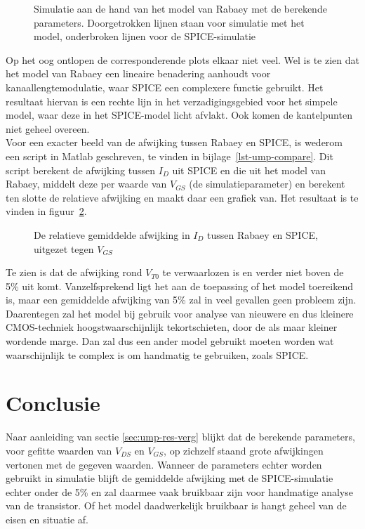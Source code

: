 \documentclass{scrartcl}
\begin{document}
\begin{figure}[H]
	\centering
	\setlength{} 
	\setlength{}
	
	\caption{Simulatie aan de hand van het model van Rabaey met de berekende parameters. Doorgetrokken lijnen staan voor simulatie met het model, onderbroken lijnen voor de SPICE-simulatie}
	\label{fig:ump-sim-fig-vds-rab}
\end{figure}

Op het oog ontlopen de corresponderende plots elkaar niet veel. Wel is te zien dat het model van Rabaey een lineaire benadering aanhoudt voor kanaallengtemodulatie, waar SPICE een complexere functie gebruikt. Het resultaat hiervan is een rechte lijn in het verzadigingsgebied voor het simpele model, waar deze in het SPICE-model licht afvlakt. Ook komen de kantelpunten niet geheel overeen. \\

Voor een exacter beeld van de afwijking tussen Rabaey en SPICE, is wederom een script in Matlab geschreven, te vinden in bijlage~\ref{lst-ump-compare}. Dit script berekent de afwijking tussen $I_{D}$ uit SPICE en die uit het model van Rabaey, middelt deze per waarde van $V_{GS}$ (de simulatieparameter) en berekent ten slotte de relatieve afwijking en maakt daar een grafiek van. Het resultaat is te vinden in figuur~\ref{fig:ump-sim-fig-vds-rel-dev}.

\begin{figure}[H]
	\centering
	\setlength{} 
	\setlength{}
	
	\caption{De relatieve gemiddelde afwijking in $I_{D}$ tussen Rabaey en SPICE, uitgezet tegen $V_{GS}$}
	\label{fig:ump-sim-fig-vds-rel-dev}
\end{figure}

Te zien is dat de afwijking rond $V_{T0}$ te verwaarlozen is en verder niet boven de 5\% uit komt. Vanzelfsprekend ligt het aan de toepassing of het model toereikend is, maar een gemiddelde afwijking van 5\% zal in veel gevallen geen probleem zijn. Daarentegen zal het model bij gebruik voor analyse van nieuwere en dus kleinere CMOS-techniek hoogstwaarschijnlijk tekortschieten, door de als maar kleiner wordende marge. Dan zal dus een ander model gebruikt moeten worden wat waarschijnlijk te complex is om handmatig te gebruiken, zoals SPICE.

\section{Conclusie}
\label{sec:ump-conclusie}
Naar aanleiding van sectie \ref{sec:ump-res-verg} blijkt dat de berekende parameters, voor gefitte waarden van $V_{DS}$ en $V_{GS}$, op zichzelf staand grote afwijkingen vertonen met de gegeven waarden. Wanneer de parameters echter worden gebruikt in simulatie blijft de gemiddelde afwijking met de SPICE-simulatie echter onder de 5\% en zal daarmee vaak bruikbaar zijn voor handmatige analyse van de transistor. Of het model daadwerkelijk bruikbaar is hangt geheel van de eisen en situatie af.
\end{document}
